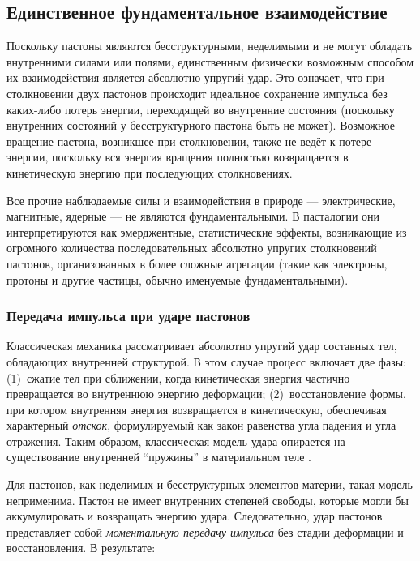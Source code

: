 \documentclass[pdflatex,sn-mathphys-num]{sn-jnl}
\begin{document}
\subsection{Единственное фундаментальное взаимодействие}\label{subsec:interaction}

Поскольку пастоны являются бесструктурными, неделимыми и не могут обладать внутренними силами или полями, единственным физически возможным способом их взаимодействия является абсолютно упругий удар. Это означает, что при столкновении двух пастонов происходит идеальное сохранение импульса без каких-либо потерь энергии, переходящей во внутренние состояния (поскольку внутренних состояний у бесструктурного пастона быть не может). Возможное вращение пастона, возникшее при столкновении, также не ведёт к потере энергии, поскольку вся энергия вращения полностью возвращается в кинетическую энергию при последующих столкновениях.

Все прочие наблюдаемые силы и взаимодействия в природе --- электрические, магнитные, ядерные --- не являются фундаментальными. В пасталогии они интерпретируются как эмерджентные, статистические эффекты, возникающие из огромного количества последовательных абсолютно упругих столкновений пастонов, организованных в более сложные агрегации (такие как электроны, протоны и другие частицы, обычно именуемые фундаментальными).

\subsubsection{Передача импульса при ударе пастонов}\label{subsubsec:impulse-transfer}

Классическая механика рассматривает абсолютно упругий удар составных тел, обладающих внутренней структурой. В этом случае процесс включает две фазы: (1)~сжатие тел при сближении, когда кинетическая энергия частично превращается во внутреннюю энергию деформации; (2)~восстановление формы, при котором внутренняя энергия возвращается в кинетическую, обеспечивая характерный \emph{отскок}, формулируемый как закон равенства угла падения и угла отражения. Таким образом, классическая модель удара опирается на существование внутренней ``пружины'' в материальном теле \cite{feynman-lectures-v1}.

Для пастонов, как неделимых и бесструктурных элементов материи, такая модель неприменима. Пастон не имеет внутренних степеней свободы, которые могли бы аккумулировать и возвращать энергию удара. Следовательно, удар пастонов представляет собой \emph{моментальную передачу импульса} без стадии деформации и восстановления. В результате:
\end{document}
